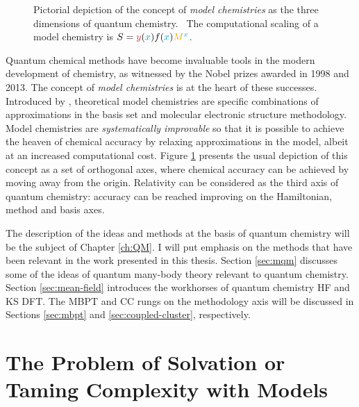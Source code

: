 \begin{figure}[tb]
\centering
\scalebox{0.7}{}
\caption[Pictorial depiction of the concept of \emph{model chemistries}.]{
Pictorial depiction of the concept of \emph{model chemistries} as the
three dimensions of quantum chemistry.~\autocite{Pople1999-gt, Saue2011-qg}
The computational scaling of a model chemistry is
$S=\textcolor{PMS1797}{y}(\textcolor{PMS2229}{x})f(\textcolor{PMS2229}{x})\textcolor{PMS130}{M}^{\textcolor{PMS2229}{x}}$.
}
\label{fig:RQC-axis}
\end{figure}

Quantum chemical methods have become invaluable tools in the modern
development of chemistry,\autocite{Lee1995-pw, Helgaker2004-oz,
Tajti2004-ye} as witnessed by the Nobel prizes awarded in 1998\autocite{Nobel1998}
and 2013.\autocite{Nobel2013}
The concept of \emph{model chemistries} is at the heart of these
successes. Introduced by \citeauthor{Pople1999-gt}, theoretical model
chemistries are specific combinations of approximations in the basis set
and molecular electronic structure methodology.\autocite{Pople1999-gt}
Model chemistries are \emph{systematically improvable} so that it is
possible to achieve the heaven of chemical accuracy by relaxing
approximations in the model, albeit at an increased computational cost.
Figure \ref{fig:RQC-axis} presents the usual depiction of this concept
as a set of orthogonal axes, where chemical accuracy can be achieved by
moving away from the origin.
Relativity can be considered as the third axis of quantum
chemistry: accuracy can be reached improving on the Hamiltonian, method
and basis axes.\autocite{Saue2011-qg}

The description of the ideas and methods at the basis of quantum
chemistry will be the subject of Chapter \ref{ch:QM}.
I will put emphasis on the methods that have been relevant in the work
presented in this thesis. Section \ref{sec:mqm} discusses some of the
ideas of quantum many-body theory relevant to quantum chemistry. Section
\ref{sec:mean-field} introduces the workhorses of quantum chemistry
\acrlong*{HF} and \acrlong*{KS} \acrlong*{DFT}.
The \acrlong*{MBPT} and \acrlong*{CC} rungs on the methodology axis will
be discussed in Sections \ref{sec:mbpt} and \ref{sec:coupled-cluster},
respectively.

\section*{The Problem of Solvation or Taming Complexity with Models}

